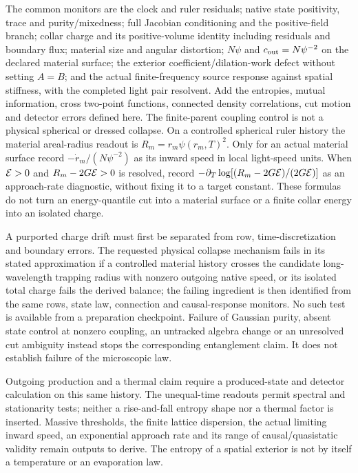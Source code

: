 \documentclass[11pt]{article}
\begin{document}
The common monitors are the clock and ruler residuals; native
state positivity, trace and purity/mixedness; full Jacobian
conditioning and the positive-field branch; collar charge and
its positive-volume identity including residuals and boundary
flux; material size and angular distortion; $N\psi$ and
$c_{\rm out}=N\psi^{-2}$ on the declared material surface;
the exterior coefficient/dilation-work defect without setting
$A=B$; and the actual finite-frequency source response against
spatial stiffness, with the completed light pair resolvent.
Add the entropies, mutual information, cross two-point functions,
connected density correlations, cut motion and detector errors
defined here.  The finite-parent coupling control is not a
physical spherical or dressed collapse.
On a controlled spherical ruler history the material areal-radius
readout is $R_m=r_m\psi(r_m,T)^2$.  Only for an actual material
surface record $-\dot r_m/(N\psi^{-2})$ as its inward speed in
local light-speed units.  When ${\cal E}>0$ and
$R_m-2G{\cal E}>0$ is resolved,
record $-\partial_T\log[(R_m-2G{\cal E})/(2G{\cal E})]$ as an
approach-rate diagnostic, without fixing it to a target constant.
These formulas do not turn an energy-quantile cut into a material
surface or a finite collar energy into an isolated charge.

A purported charge drift must first be separated from row,
time-discretization and boundary errors.  The requested physical
collapse mechanism fails in its stated approximation if a
controlled material history crosses the candidate
long-wavelength trapping radius with nonzero outgoing native
speed, or its isolated total charge fails the derived balance;
the failing ingredient is then identified from the same rows,
state law, connection and causal-response monitors.
No such test is available from a preparation checkpoint.
Failure of Gaussian purity, absent state control at nonzero
coupling, an untracked algebra change or an unresolved cut
ambiguity instead stops the corresponding entanglement claim.
It does not establish failure of the microscopic law.

Outgoing production and a thermal claim require a produced-state
and detector calculation on this same history.  The unequal-time
readouts permit spectral and stationarity tests; neither a
rise-and-fall entropy shape nor a thermal factor is inserted.
Massive thresholds, the finite lattice dispersion, the actual
limiting inward speed, an exponential approach rate and its
range of causal/quasistatic validity remain outputs to derive.
The entropy of a spatial exterior is not by itself a temperature
or an evaporation law.
\end{document}
